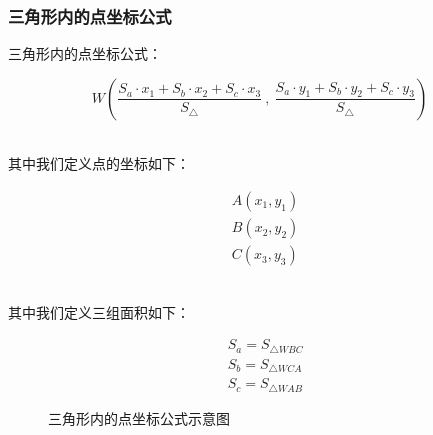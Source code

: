 \documentclass[UTF8]{ctexart}
\begin{document}
\subsubsection{三角形内的点坐标公式}
    三角形内的点坐标公式：\vspace{5pt}
    \begin{large}
        \begin{equation*}
            W\left(\frac{S_a\cdot x_1+S_b\cdot x_2+S_c\cdot x_3}{S_\triangle}~,~\frac{S_a\cdot y_1+S_b\cdot y_2+S_c\cdot y_3}{S_\triangle}\right)
        \end{equation*}
    \end{large}\\
    其中我们定义点的坐标如下：
    \begin{large}
        \begin{align*}
            &A(x_1,y_1)\\[3mm]
            &B(x_2,y_2)\\[3mm]
            &C(x_3,y_3)
        \end{align*}
    \end{large}\\
    其中我们定义三组面积如下：
    \begin{large}
        \begin{align*}
            &S_a=S_{\triangle WBC}\\[3mm]
            &S_b=S_{\triangle WCA}\\[3mm]
            &S_c=S_{\triangle WAB}
        \end{align*}
    \end{large}
    \begin{figure}[h!]
        \begin{center}
            \caption{三角形内的点坐标公式示意图}
        \end{center}
    \end{figure}
\end{document}
